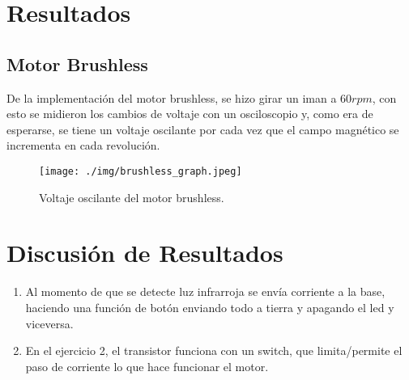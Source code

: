 \documentclass[conference]{IEEEtran}
\begin{document}
    
%
\section{Resultados}
\subsection{Motor Brushless}
De la implementación del motor brushless, se hizo girar un iman a $60rpm$, con esto se midieron los cambios de voltaje con un osciloscopio y, como era de esperarse, se tiene un voltaje oscilante por cada vez que el campo magnético se incrementa en cada revolución.

\begin{figure}[H]
	\centering
	\texttt{[image: ./img/brushless\_graph.jpeg]}
	\caption{Voltaje oscilante del motor brushless.}
	\label{brushcirc}
\end{figure}
    
\section{Discusión de Resultados}
\begin{enumerate}
    \item Al momento de que se detecte luz infrarroja se envía corriente a la base, haciendo una función de botón enviando todo a tierra y apagando el led y viceversa.
   	\item En el ejercicio 2, el transistor funciona con un switch, que limita/permite el paso de corriente lo que hace funcionar el motor.
\end{enumerate}
\end{document}
